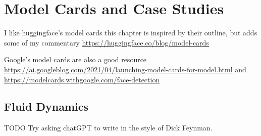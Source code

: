 \setchapterpreamble[u]{\margintoc}
\chapter{Model Cards and Case Studies}

I like huggingface's model cards this chapter is inspired by their outline, but adds some of my commentary \url{https://huggingface.co/blog/model-cards}

Google's model cards are also a good resource \url{https://ai.googleblog.com/2021/04/launching-model-cards-for-model.html} and \url{https://modelcards.withgoogle.com/face-detection}

\section{Fluid Dynamics}

TODO Try asking chatGPT to write in the style of Dick Feynman.

